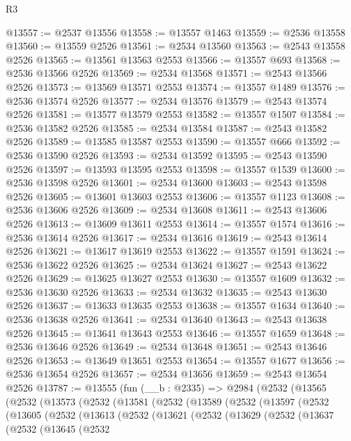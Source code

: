 \begin{lexlean}{R3}
\begin{coremodule}
@13557 := @2537 @13556
@13558 := @13557 @1463
@13559 := @2536 @13558
@13560 := @13559 @2526
@13561 := @2534 @13560
@13563 := @2543 @13558 @2526
@13565 := @13561 @13563 @2553
@13566 := @13557 @693
@13568 := @2536 @13566 @2526
@13569 := @2534 @13568
@13571 := @2543 @13566 @2526
@13573 := @13569 @13571 @2553
@13574 := @13557 @1489
@13576 := @2536 @13574 @2526
@13577 := @2534 @13576
@13579 := @2543 @13574 @2526
@13581 := @13577 @13579 @2553
@13582 := @13557 @1507
@13584 := @2536 @13582 @2526
@13585 := @2534 @13584
@13587 := @2543 @13582 @2526
@13589 := @13585 @13587 @2553
@13590 := @13557 @666
@13592 := @2536 @13590 @2526
@13593 := @2534 @13592
@13595 := @2543 @13590 @2526
@13597 := @13593 @13595 @2553
@13598 := @13557 @1539
@13600 := @2536 @13598 @2526
@13601 := @2534 @13600
@13603 := @2543 @13598 @2526
@13605 := @13601 @13603 @2553
@13606 := @13557 @1123
@13608 := @2536 @13606 @2526
@13609 := @2534 @13608
@13611 := @2543 @13606 @2526
@13613 := @13609 @13611 @2553
@13614 := @13557 @1574
@13616 := @2536 @13614 @2526
@13617 := @2534 @13616
@13619 := @2543 @13614 @2526
@13621 := @13617 @13619 @2553
@13622 := @13557 @1591
@13624 := @2536 @13622 @2526
@13625 := @2534 @13624
@13627 := @2543 @13622 @2526
@13629 := @13625 @13627 @2553
@13630 := @13557 @1609
@13632 := @2536 @13630 @2526
@13633 := @2534 @13632
@13635 := @2543 @13630 @2526
@13637 := @13633 @13635 @2553
@13638 := @13557 @1634
@13640 := @2536 @13638 @2526
@13641 := @2534 @13640
@13643 := @2543 @13638 @2526
@13645 := @13641 @13643 @2553
@13646 := @13557 @1659
@13648 := @2536 @13646 @2526
@13649 := @2534 @13648
@13651 := @2543 @13646 @2526
@13653 := @13649 @13651 @2553
@13654 := @13557 @1677
@13656 := @2536 @13654 @2526
@13657 := @2534 @13656
@13659 := @2543 @13654 @2526
@13787 := @13555
    (fun (__b : @2335) =>
    @2984
      (@2532
        (@13565
          (@2532
            (@13573
              (@2532
                (@13581
                  (@2532
                    (@13589
                      (@2532
                        (@13597
                          (@2532
                            (@13605
                              (@2532
                                (@13613
                                  (@2532
                                    (@13621
                                      (@2532
                                        (@13629
                                          (@2532
                                            (@13637
                                              (@2532
                                                (@13645
                                                  (@2532

\end{coremodule}
\end{lexlean}
